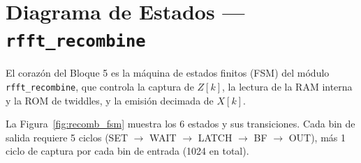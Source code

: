 \documentclass[12pt, a4paper]{article}
\begin{document}
\section{Diagrama de Estados — \texttt{rfft\_recombine}}

El corazón del Bloque 5 es la máquina de estados finitos (FSM) del módulo
\texttt{rfft\_recombine}, que controla la captura de $Z[k]$, la lectura de
la RAM interna y la ROM de twiddles, y la emisión decimada de $X[k]$.

La Figura~\ref{fig:recomb_fsm} muestra los 6 estados y sus transiciones.
Cada bin de salida requiere 5 ciclos (SET $\rightarrow$ WAIT $\rightarrow$
LATCH $\rightarrow$ BF $\rightarrow$ OUT), más 1 ciclo de captura por cada
bin de entrada (1024 en total).
\end{document}
